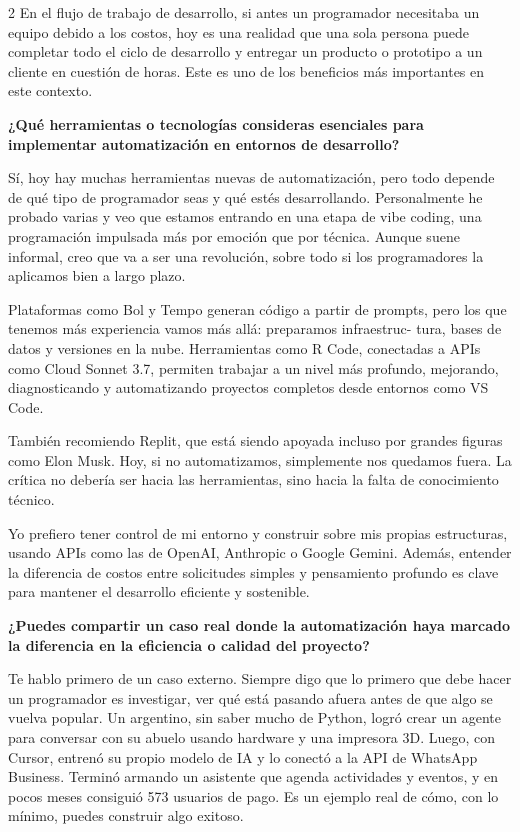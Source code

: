 \documentclass[12pt,spanish,Letterpaper,openany]{book}
\begin{document}
\begin {multicols}{2}
En el flujo de trabajo de desarrollo, si antes un programador necesitaba un equipo debido a los costos, hoy es una realidad que una sola persona puede completar todo el ciclo de desarrollo y entregar un producto o prototipo a un cliente en cuestión de horas. Este es uno de los beneficios más importantes en este contexto.

\textbf{¿Qué herramientas o tecnologías consideras esenciales para implementar automatización en entornos de desarrollo?}

Sí, hoy hay muchas herramientas nuevas de automatización, pero todo depende de qué tipo de programador seas y qué estés desarrollando. Personalmente he probado varias y veo que estamos entrando en una etapa de vibe coding, una programación impulsada más por emoción que por técnica. Aunque suene informal, creo que va a ser una revolución, sobre todo si los programadores la aplicamos bien a largo plazo.

Plataformas como Bol y Tempo generan código a partir de prompts, pero los que tenemos más experiencia vamos más allá: preparamos infraestruc-
tura, bases de datos y versiones en la nube. Herramientas como R Code, conectadas a APIs como Cloud Sonnet 3.7, permiten trabajar a un nivel más profundo, mejorando, diagnosticando y automatizando proyectos completos desde entornos como VS Code.

También recomiendo Replit, que está siendo apoyada incluso por grandes figuras como Elon Musk. Hoy, si no automatizamos, simplemente nos quedamos fuera. La crítica no debería ser hacia las herramientas, sino hacia la falta de conocimiento técnico.

Yo prefiero tener control de mi entorno y construir sobre mis propias estructuras, usando APIs como las de OpenAI, Anthropic o Google Gemini. Además, entender la diferencia de costos entre solicitudes simples y pensamiento profundo es clave para mantener el desarrollo eficiente y sostenible.

\textbf{¿Puedes compartir un caso real donde la automatización haya marcado la diferencia en la eficiencia o calidad del proyecto?}

Te hablo primero de un caso externo. Siempre digo que lo primero que debe hacer un programador es investigar, ver qué está pasando afuera antes de que algo se vuelva popular.
Un argentino, sin saber mucho de Python, logró crear un agente para conversar con su abuelo usando hardware y una impresora 3D. Luego, con Cursor, entrenó su propio modelo de IA y lo conectó a la API de WhatsApp Business. Terminó armando un asistente que agenda actividades y eventos, y en pocos meses consiguió 573 usuarios de pago. Es un ejemplo real de cómo, con lo mínimo, puedes construir algo exitoso.


\end{multicols}
\end{document}
